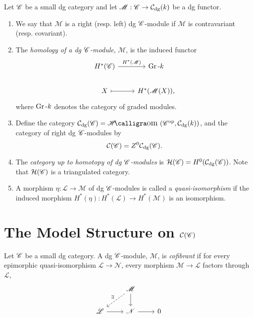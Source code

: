 \documentclass[dissertation.tex]{subfiles}
\begin{document}
\begin{defn}
  Let $\mathscr{C}$ be a small dg category and let $\mathscr{M} : \mathscr{C} \rightarrow \mathcal{C}_\text{dg}(k)$ be a dg functor.
  \begin{enumerate}
  \item
    We say that $\mathscr{M}$ is a right (resp. left) dg $\mathscr{C}$-module if $\mathscr{M}$ is contravariant (resp. covariant).
  \item
    The {\it homology of a dg $\mathscr{C}$-module}, $\mathscr{M}$, is the induced functor
    $$\begin{tikzcd}
      H^\ast(\CC) \arrow{r}{H^\ast(\mathscr{M})}& \Gr{k}\\
      X \arrow[mapsto]{r} & H^\ast(\mathscr{M}(X)),
    \end{tikzcd}$$
    where $\operatorname{Gr}\text{-}k$ denotes the category of graded modules.
  \item
    Define the category $\mathcal{C}_\text{dg}(\CC) = \SHom{\CC^\text{op}, \mathcal{C}_\text{dg}(k)}$, and the category of right dg $\mathscr{C}$-modules by
    $$\mathcal{C}(\mathscr{C}) = Z^0 \mathcal{C}_\text{dg}(\mathscr{C}).$$
  \item
    The {\it category up to homotopy of dg $\mathscr{C}$-modules} is $\mathcal{H}(\mathscr{C}) = H^0(\mathcal{C}_\text{dg}(\mathscr{C}))$.
    Note that $\mathcal{H}(\mathscr{C})$ is a triangulated category.
  \item
    A morphism $\eta \colon \mathscr{L} \rightarrow \mathscr{M}$ of dg $\mathscr{C}$-modules is called a {\it quasi-isomorphism} if the induced morphism $H^\ast(\eta) \colon H^\ast(\mathscr{L}) \rightarrow H^\ast(\mathscr{M})$ is an isomorphism.
  \end{enumerate}
\end{defn}

\section{The Model Structure on $\mathcal{C}(\mathscr{C})$}

\begin{defn}
  Let $\mathscr{C}$ be a small dg category.
  A dg $\mathscr{C}$-module, $\mathscr{M}$, is {\it cofibrant} if for every epimorphic quasi-isomorphism $\mathscr{L} \rightarrow \mathscr{N}$, every morphism $\mathscr{M} \rightarrow \mathscr{L}$ factors through $\mathscr{L}$,
  $$\begin{tikzcd}
    & \mathscr{M}\arrow{d}\arrow[dashed,swap]{ld}{\exists}\\
    \mathscr{L} \arrow{r} & \mathscr{N} \arrow{r} & 0
  \end{tikzcd}$$
\end{defn}
\end{document}
